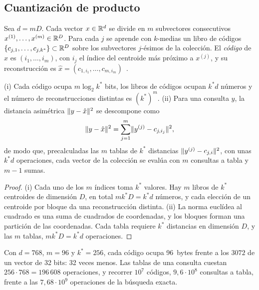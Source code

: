 \subsection{Cuantización de producto}

\begin{definicion}\label{def:pq}
Sea $d=mD$. Cada vector $x\in\mathbb{R}^{d}$ se divide en $m$ subvectores consecutivos $x^{(1)},\dots,x^{(m)}\in\mathbb{R}^{D}$. Para cada $j$ se aprende con $k$-medias un libro de códigos $\{c_{j,1},\dots,c_{j,k^\ast}\}\subset\mathbb{R}^{D}$ sobre los subvectores $j$-ésimos de la colección. El \emph{código} de $x$ es $(i_1,\dots,i_m)$, con $i_j$ el índice del centroide más próximo a $x^{(j)}$, y su reconstrucción es $\hat x=(c_{1,i_1},\dots,c_{m,i_m})$~\cite{jegou}.
\end{definicion}

\begin{proposicion}\label{prop:pq}
(i) Cada código ocupa $m\log_2 k^\ast$ bits, los libros de códigos ocupan $k^\ast d$ números y el número de reconstrucciones distintas es $(k^\ast)^{m}$. (ii) Para una consulta $y$, la distancia asimétrica $\lVert y-\hat x\rVert^{2}$ se descompone como
\[
\lVert y-\hat x\rVert^{2}=\sum_{j=1}^{m}\lVert y^{(j)}-c_{j,i_j}\rVert^{2},
\]
de modo que, precalculadas las $m$ tablas de $k^\ast$ distancias $\lVert y^{(j)}-c_{j,i}\rVert^{2}$, con unas $k^\ast d$ operaciones, cada vector de la colección se evalúa con $m$ consultas a tabla y $m-1$ sumas.
\end{proposicion}

\begin{proof}
(i) Cada uno de los $m$ índices toma $k^\ast$ valores. Hay $m$ libros de $k^\ast$ centroides de dimensión $D$, en total $mk^\ast D=k^\ast d$ números, y cada elección de un centroide por bloque da una reconstrucción distinta. (ii) La norma euclídea al cuadrado es una suma de cuadrados de coordenadas, y los bloques forman una partición de las coordenadas. Cada tabla requiere $k^\ast$ distancias en dimensión $D$, y las $m$ tablas, $mk^\ast D=k^\ast d$ operaciones.
\end{proof}

\begin{ejemplo}\label{ej:pq}
Con $d=768$, $m=96$ y $k^\ast=256$, cada código ocupa 96~bytes frente a los $3072$ de un vector de 32 bits: 32 veces menos. Las tablas de una consulta cuestan $256\cdot 768=196\,608$ operaciones, y recorrer $10^{7}$ códigos, $9{,}6\cdot 10^{8}$ consultas a tabla, frente a las $7{,}68\cdot 10^{9}$ operaciones de la búsqueda exacta.
\end{ejemplo}

